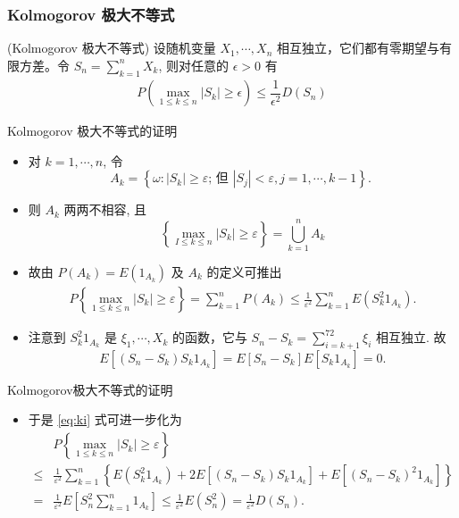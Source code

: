 \begin{frame}
	\frametitle{{\rm Kolmogorov} 极大不等式}
	\begin{thm}
		({\rm Kolmogorov} 极大不等式) 设随机变量 $X_1,\cdots, X_n$ 相互独立，它们都有零期望与有限方差。令 $S_n=\sum_{k=1}^nX_k$, 则对任意的 $\epsilon>0$ 有
		\begin{eqnarray}\label{eq:klie}
			P(\max_{1\leq k\leq n}|S_k|\geq \epsilon)\leq \dfrac{1}{\epsilon^2}D(S_n)
		\end{eqnarray}

	\end{thm}



\end{frame}
\begin{frame}{{\rm Kolmogorov} 极大不等式的证明}
\begin{itemize}[<+-|alert@+>]
	\item 对 $k=1, \cdots, n$, 令
	\[
	A_{k}=\left\{\omega:\left|S_{k}\right| \geq \varepsilon \text {; 但 }\left|S_{j}\right|<\varepsilon, j=1, \cdots, k-1\right\} \text {. }
	\]
\item 则 $A_{k}$ 两两不相容, 且
	\[
	\left\{\max _{I \leq k \leq n}\left|S_{k}\right| \geq \varepsilon\right\}=\bigcup_{k=1}^{n} A_{k}
	\]
\item 故由 $P\left(A_{k}\right)=E\left(1_{A_k}\right)$ 及 $A_{k}$ 的定义可推出
	\begin{align}\label{eq:ki}
		P\left\{\max _{1 \leq k \leq n}\left|S_{k}\right| \geq \varepsilon\right\}=\sum_{k=1}^{n} P\left(A_{k}\right) \leq \frac{1}{\varepsilon^{2}} \sum_{k=1}^{n} E\left(S_{k}^{2} 1_{A_k}\right).
	\end{align}

	\item 注意到 $S_{k}^{2} 1_{A_k}$ 是 $\xi_{1}, \cdots, X_{k}$ 的函数，它与 $S_{n}-S_{k}=\sum_{i=k+1}^{72} \xi_{i}$ 相互独立. 故
	\[
	E\left[\left(S_{n}-S_{k}\right) S_{k} 1_{A_k}\right]=E\left[S_n-S_{k}\right] E\left[S_{k} 1_{A_k}\right]=0 .
	\]
\end{itemize}

\end{frame}

\begin{frame}{Kolmogorov极大不等式的证明}
\begin{itemize}[<+-|alert@+>]
	\item 于是 \eqref{eq:ki} 式可进一步化为
	\[\begin{aligned}
		& P\left\{\max _{1 \leq k \leq n}\left|S_{k}\right| \geq \varepsilon\right\} \\
		\leq & \frac{1}{\varepsilon^{2}} \sum_{k=1}^{n}\left\{E\left(S_{k}^{2} 1_{A_k}\right)+2 E\left[\left(S_{n}-S_{k}\right) S_{k} 1_{A_k}\right]+E\left[\left(S_{n}-S_{k}\right)^{2} 1_{A_k}\right]\right\} \\
		= & \frac{1}{\varepsilon^{2}} E\left[S_{n}^{2} \sum_{k=1}^{n} 1_{A_k}\right] \leq \frac{1}{\varepsilon^{2}} E\left(S_{n}^{2}\right)=\frac{1}{\varepsilon^{2}} D\left(S_{n}\right) .
	\end{aligned}
	\]
\end{itemize}


\end{frame}

